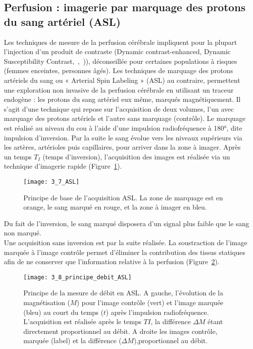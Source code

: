 \subsection{Perfusion : imagerie par marquage des protons du sang artériel (ASL)}
Les techniques de mesure de la perfusion cérébrale impliquent pour la plupart l’injection d’un
produit de contraste (Dynamic contrast-enhanced, Dynamic Susceptibility Contrast,~\cite{Calamante2010},~\cite{OConnor2011})),
déconseillée pour certaines populations à risques (femmes enceintes, personnes âgés). Les techniques
de marquage des protons artériels du sang ou « Arterial Spin Labeling » (ASL) au contraire, permettent
une exploration non invasive de la perfusion cérébrale en utilisant un traceur endogène : les protons
du sang artériel eux même, marqués magnétiquement. Il s’agit d’une technique qui repose sur
l’acquisition de deux volumes, l’un avec marquage des protons artériels et l’autre sans marquage
(contrôle). Le marquage est réalisé au niveau du cou à l’aide d’une impulsion radiofréquence à 180°,
dite impulsion d’inversion. Par la suite le sang évolue vers les niveaux supérieurs via les artères,
artérioles puis capillaires, pour arriver dans la zone à imager. Après un temps $T_I$ (temps d’inversion),
l’acquisition des images est réalisée via un technique d’imagerie rapide (Figure~\ref{fig:3_7_ASL}). 
\begin{figure}[!t]
\centering
\texttt{[image: 3\_7\_ASL]}
\caption{Principe de base de l'acquisition ASL. La zone de marquage est en orange, le sang marqué en rouge, et la zone à
imager en bleu.}
\label{fig:3_7_ASL}	
\end{figure}
Du fait de
l’inversion, le sang marqué disposera d’un signal plus faible que le sang non marqué.\\
Une acquisition sans inversion est par la suite réalisée. La soustraction de l’image marquée à
l’image contrôle permet d’éliminer la contribution des tissus statiques afin de ne conserver que
l’information relative à la perfusion (Figure~\ref{fig:3_8_principe_debit_ASL}).
\begin{figure}[!t]
\centering
\texttt{[image: 3\_8\_principe\_debit\_ASL]}
\caption{Principe de la mesure de débit en ASL. A gauche, l’évolution de la magnétisation ($M$) pour l’image contrôle (vert) et
l’image marquée (bleu) au court du temps ($t$) après l’impulsion radiofréquence. L’acquisition est réalisée après le temps $TI$, la
différence $\Delta M$ étant directement proportionnel au débit. A droite les images contrôle, marquée (label) et la différence ($\Delta M$),proportionnel au débit.}
\label{fig:3_8_principe_debit_ASL}	
\end{figure}
